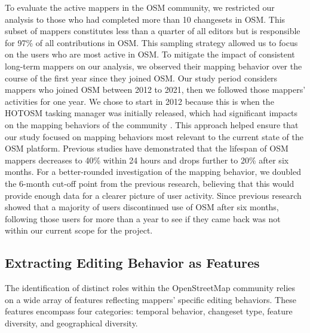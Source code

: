 \documentclass[manuscript,screen,review]{acmart}
\begin{document}
To evaluate the active mappers in the OSM community, we restricted our analysis to those who had completed more than 10 changesets in OSM. This subset of mappers constitutes less than a quarter of all editors but is responsible for 97\% of all contributions in OSM. This sampling strategy allowed us to focus on the users who are most active in OSM. To mitigate the impact of consistent long-term mappers on our analysis, we observed their mapping behavior over the course of the first year since they joined OSM. Our study period considers mappers who joined OSM between 2012 to 2021, then we followed those mappers' activities for one year. We chose to start in 2012 because this is when the HOTOSM tasking manager was initially released, which had significant impacts on the mapping behaviors of the community \cite{herfort2021evolution}. This approach helped ensure that our study focused on mapping behaviors most relevant to the current state of the OSM platform. Previous studies\cite{BeginDR18} have demonstrated that the lifespan of OSM mappers decreases to 40\% within 24 hours and drops further to 20\% after six months. For a better-rounded investigation of the mapping behavior, we doubled the 6-month cut-off point from the previous research, believing that this would provide enough data for a clearer picture of user activity. Since previous research showed that a majority of users discontinued use of OSM after six months, following those users for more than a year to see if they came back was not within our current scope for the project.


\subsection{Extracting Editing Behavior as Features} \label{feature_group}

The identification of distinct roles within the OpenStreetMap community relies on a wide array of features reflecting mappers' specific editing behaviors. These features encompass four categories: temporal behavior, changeset type, feature diversity, and geographical diversity.
\end{document}
